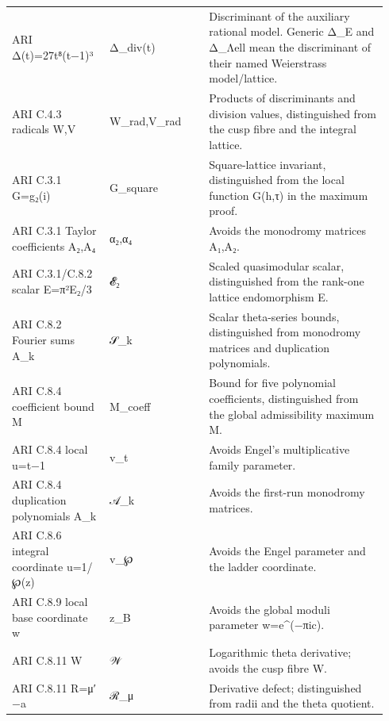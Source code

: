 \documentclass[11pt,a4paper]{article}
\theoremstyle{plain}
\theoremstyle{definition}
\begin{document}
\begin{longtable}{@{}L{0.24\linewidth}L{0.25\linewidth}L{0.45\linewidth}@{}}
ARI Δ(t)=27t⁸(t−1)³ & Δ\_\allowbreak{}div(t) & Discriminant of the auxiliary rational model. Generic Δ\_\allowbreak{}E and Δ\_\allowbreak{}Λell mean the discriminant of their named Weierstrass model/\allowbreak{}lattice.\\
ARI C.4.3 radicals W,V & W\_\allowbreak{}rad,V\_\allowbreak{}rad & Products of discriminants and division values, distinguished from the cusp fibre and the integral lattice.\\
ARI C.3.1 G=g₂(i) & G\_\allowbreak{}square & Square-lattice invariant, distinguished from the local function G(h,τ) in the maximum proof.\\
ARI C.3.1 Taylor coefficients A₂,A₄ & α₂,α₄ & Avoids the monodromy matrices A₁,A₂.\\
ARI C.3.1/\allowbreak{}C.8.2 scalar E=π²E₂/\allowbreak{}3 & 𝓔₂ & Scaled quasimodular scalar, distinguished from the rank-one lattice endomorphism E.\\
ARI C.8.2 Fourier sums A\_\allowbreak{}k & 𝒮\_\allowbreak{}k & Scalar theta-series bounds, distinguished from monodromy matrices and duplication polynomials.\\
ARI C.8.4 coefficient bound M & M\_\allowbreak{}coeff & Bound for five polynomial coefficients, distinguished from the global admissibility maximum M.\\
ARI C.8.4 local u=t−1 & v\_\allowbreak{}t & Avoids Engel's multiplicative family parameter.\\
ARI C.8.4 duplication polynomials A\_\allowbreak{}k & 𝒜\_\allowbreak{}k & Avoids the first-run monodromy matrices.\\
ARI C.8.6 integral coordinate u=1/\allowbreak{}℘(z) & v\_\allowbreak{}℘ & Avoids the Engel parameter and the ladder coordinate.\\
ARI C.8.9 local base coordinate w & z\_\allowbreak{}B & Avoids the global moduli parameter w=e\textasciicircum{}(−πic).\\
ARI C.8.11 W & 𝒲 & Logarithmic theta derivative; avoids the cusp fibre W.\\
ARI C.8.11 R=μ′−a & ℛ\_\allowbreak{}μ & Derivative defect; distinguished from radii and the theta quotient.\\
\bottomrule\end{longtable}\endgroup
\end{document}
